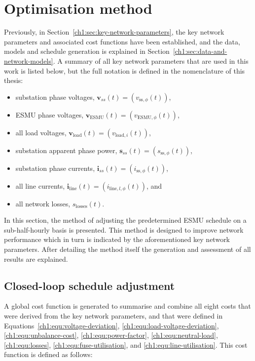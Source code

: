 \section{Optimisation method}
\label{ch1:sec:closed-loop-optimisation-method}

Previously, in Section~\ref{ch1:sec:key-network-parameters}, the key network parameters and associated cost functions have been established, and the data, models and schedule generation is explained in Section~\ref{ch1:sec:data-and-network-models}.
A summary of all key network parameters that are used in this work is listed below, but the full notation is defined in the nomenclature of this thesis:

\begin{itemize}
	\item substation phase voltages, $\textbf{v}_{ss}(t) = (v_{\text{ss},\phi}(t))$,
	\item ESMU phase voltages, $\textbf{v}_\text{ESMU}(t) = (v_{\text{ESMU},\phi}(t))$,
	\item all load voltages, $\textbf{v}_\text{load}(t) = (v_{\text{load},i}(t))$,
	\item substation apparent phase power, $\textbf{s}_{ss}(t) = (s_{\text{ss},\phi}(t))$,
	\item substation phase currents, $\textbf{i}_{ss}(t) = (i_{\text{ss},\phi}(t))$,
	\item all line currents, $\textbf{i}_\text{line}(t) = (i_{\text{line},l,\phi}(t))$, and
	\item all network losses, $s_\text{losses}(t)$.
\end{itemize}

In this section, the method of adjusting the predetermined ESMU schedule on a sub-half-hourly basis is presented.
This method is designed to improve network performance which in turn is indicated by the aforementioned key network parameters.
After detailing the method itself the generation and assessment of all results are explained. 

\subsection{Closed-loop schedule adjustment}

A global cost function is generated to summarise and combine all eight costs that were derived from the key network parameters, and that were defined in Equations~\ref{ch1:equ:voltage-deviation}, \ref{ch1:equ:load-voltage-deviation}, \ref{ch1:equ:unbalance-cost}, \ref{ch1:equ:power-factor}, \ref{ch1:equ:neutral-load}, \ref{ch1:equ:losses}, \ref{ch1:equ:fuse-utilisation}, and \ref{ch1:equ:line-utilisation}.
This cost function is defined as follows:

